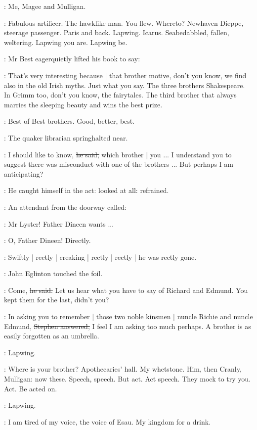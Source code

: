 \StephenInt:
Me, Magee and Mulligan.

\StephenInt:
Fabulous artificer.
The hawklike man.
You flew.
Whereto?
Newhaven-Dieppe,
steerage passenger.
Paris and back.
Lapwing.
Icarus.
Seabedabbled, fallen, weltering.
Lapwing you are.
Lapwing be.

:
Mr Best eagerquietly lifted his book to say:

\best:
That's very interesting because |
that brother motive,
don't you know,
we find also in the old Irish myths.
Just what you say.
The three brothers Shakespeare.
In Grimm too,
don't you know,
the fairytales.
The third brother that always marries the sleeping beauty
and wins the best prize.

\StephenInt:
Best of Best brothers.
Good,
better,
best.

:
The quaker librarian springhalted near.

\librarian:
I should like to know,
\sout{he said,}
which brother |
you ...
I understand you to suggest there was misconduct with one of the brothers ...
But perhaps I am anticipating?

:
He caught himself in the act:
looked at all:
refrained.

:
An attendant from the doorway called:

\attendant:
Mr Lyster!
Father Dineen wants ...

\librarian:
O, Father Dineen!
Directly.

:
Swiftly | rectly | creaking | rectly | rectly | he was rectly gone.

:
John Eglinton touched the foil.

\eglinton:
Come,
\sout{he said.}
Let us hear what you have to say of Richard and Edmund.
You kept them for the last,
didn't you?

\Stephen:
In asking you to remember |
those two noble kinsmen |
nuncle Richie and nuncle Edmund,
\sout{Stephen answered,}
I feel I am asking too much perhaps.
A brother is as easily forgotten as an umbrella.

\StephenInt:
Lapwing.

\StephenInt:
Where is your brother?
Apothecaries' hall.
My whetstone.
Him,
then Cranly,
Mulligan:
now these.
Speech,
speech.
But act.
Act speech.
They mock to try you.
Act.
Be acted on.

\StephenInt:
Lapwing.

\StephenInt:
I am tired of my voice,
the voice of Esau.
My kingdom for a drink.

